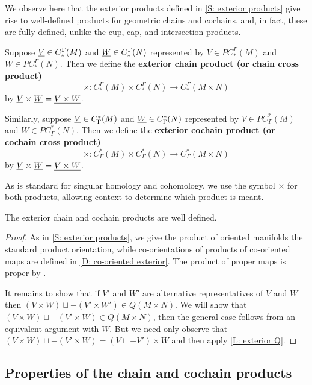 We observe here that the exterior products defined in \cref{S: exterior products} give rise to well-defined products for geometric chains and cochains, and, in fact, these are fully defined, unlike the cup, cap, and intersection products.

\begin{definition}\label{D: exterior chain}
	Suppose $\underline{V} \in C_*^{\Gamma}(M)$ and $\underline{W} \in C_*^{\Gamma}(N)$ represented by $V \in PC_*^{\Gamma}(M)$ and $W \in PC_*^{\Gamma}(N)$.
	Then we define the \textbf{exterior chain product (or chain cross product)} $$\times \colon C_*^{\Gamma}(M) \times C_*^{\Gamma}(N) \to C_*^{\Gamma}(M \times N)$$ by $\underline{V} \times \underline{W} = \underline{V \times W}$.

	Similarly, suppose $\underline{V} \in C^*_{\Gamma}(M)$ and $\underline{W} \in C^*_{\Gamma}(N)$ represented by $V \in PC^*_{\Gamma}(M)$ and $W \in PC^*_{\Gamma}(N)$.
	Then we define the \textbf{exterior cochain product (or cochain cross product)}
	$$\times \colon C^*_{\Gamma}(M) \times C^*_{\Gamma}(N) \to C^*_{\Gamma}(M \times N)$$ by $\underline{V} \times \underline{W} = \underline{V \times W}$.
\end{definition}

As is standard for singular homology and cohomology, we use the symbol $\times$ for both products, allowing context to determine which product is meant.

\begin{proposition}
	The exterior chain and cochain products are well defined.
\end{proposition}

\begin{proof}
	As in \cref{S: exterior products}, we give the product of oriented manifolds the standard product orientation, while co-orientations of products of co-oriented maps are defined in \cref{D: co-oriented exterior}.
	The product of proper maps is proper by \cite[Proposition I.10.1.4]{Bou98}.

	It remains to show that if $V'$ and $W'$ are alternative representatives of $V$ and $W$ then $(V \times W) \sqcup -(V' \times W') \in Q(M \times N)$.
	We will show that $(V \times W) \sqcup -(V' \times W) \in Q(M \times N)$, then the general case follows from an equivalent argument with $W$.
	But we need only observe that $(V \times W) \sqcup -(V' \times W) = (V \sqcup -V') \times W$ and then apply
	\cref{L: exterior Q}.
\end{proof}

\subsection{Properties of the chain and cochain products}\label{S: (co)chain properties}

